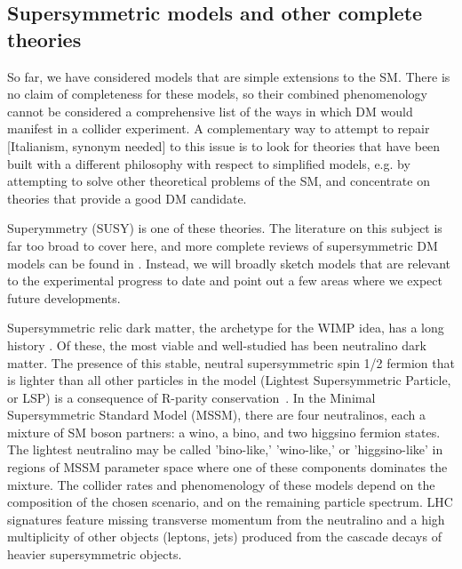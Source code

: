 
\subsection{Supersymmetric models and other complete theories}
\label{sec:SUSYModels}

So far, we have considered models that are simple extensions to the SM. There is no claim of completeness for these models,
so their combined phenomenology cannot be considered a comprehensive list of the ways in which DM would manifest in a collider experiment.
A complementary way to attempt to repair [Italianism, synonym needed] to this issue is to look for theories that have been built with
a different philosophy with respect to simplified models, e.g. by attempting to solve other theoretical problems of the SM, 
and concentrate on theories that provide a good DM candidate. 

Superymmetry (SUSY) is one of these theories.
The literature on this subject is far too broad to cover here, and more complete reviews of supersymmetric DM models can
be found in \cite{Feng:2010gw,Ellis:2010kf}. Instead, we will broadly sketch models that are relevant to
the experimental progress to date and point out a few areas where we expect future developments. 

Supersymmetric relic dark matter, the archetype for the WIMP idea, has a long
history \cite{doi:10.1016/0550-3213(84)90461-9}.
Of these, the most viable and well-studied has been neutralino dark matter. 
The presence of this stable, neutral supersymmetric spin 1/2 fermion that
is lighter than all other particles in the model (Lightest Supersymmetric Particle, or LSP) %
is a consequence of R-parity conservation~\cite{Farrar:1978xj}. %
In the Minimal Supersymmetric Standard Model (MSSM), there are four neutralinos,
each a mixture of SM boson partners: a wino, a bino, and two higgsino fermion states.
The lightest neutralino may be called 'bino-like,' 'wino-like,' or 'higgsino-like'
in regions of MSSM parameter space where one of these components dominates the mixture.
The collider rates and phenomenology of these models depend on the composition of the chosen scenario,
and on the remaining particle spectrum. 
LHC signatures feature missing transverse momentum from the neutralino and a high multiplicity of other objects
(leptons, jets) produced from the cascade decays of heavier supersymmetric objects. 

